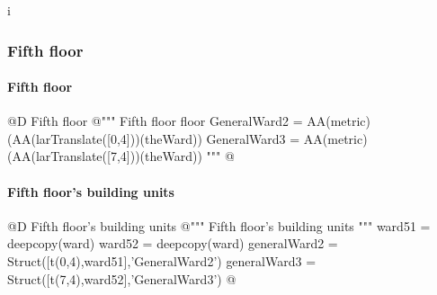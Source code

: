 i\documentclass[11pt,oneside]{article}    %
\begin{document}
\subsubsection{Fifth floor}
\paragraph{Fifth floor}
@D Fifth floor
@{""" Fifth floor floor 
GeneralWard2 = AA(metric)(AA(larTranslate([0,4]))(theWard))
GeneralWard3 = AA(metric)(AA(larTranslate([7,4]))(theWard)) """
@}


\paragraph{Fifth floor's building units}
@D Fifth floor's building units 
@{""" Fifth floor's building units """
ward51 = deepcopy(ward)
ward52 = deepcopy(ward)
generalWard2 = Struct([t(0,4),ward51],'GeneralWard2')
generalWard3 = Struct([t(7,4),ward52],'GeneralWard3')
@}
\end{document}
